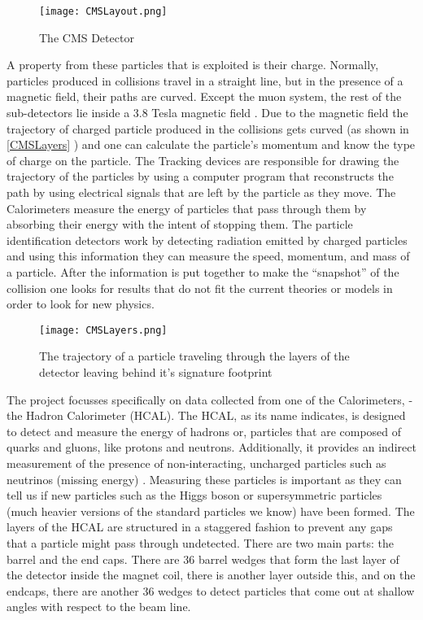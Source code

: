 \begin{figure}
\texttt{[image: CMSLayout.png]}
\caption{The CMS Detector \label{CMSLayout}}
\end{figure}

A property from these particles that is exploited is their charge. Normally, particles produced in collisions travel in a straight line, but in the presence of a magnetic field, their paths are curved. Except the muon system, the rest of the sub-detectors lie inside a 3.8 Tesla magnetic field . Due to the magnetic field the trajectory of charged particle produced in the collisions gets curved  (as shown in \autoref{CMSLayers} ) and one can calculate the particle's momentum and know the type of charge on the particle.  
The Tracking devices are responsible for drawing the trajectory of the particles by using a computer program that reconstructs the path by using electrical signals that are left by the particle as they move.  
The Calorimeters measure the energy of particles that pass through them by absorbing their energy with the intent of stopping them. The particle identification detectors work by detecting radiation emitted by charged particles and using this information they can measure the speed, momentum, and mass of a particle. After the information is put together to make the “snapshot” of the collision one looks for results that do not fit the current theories or models in order to look for new physics. \cite{CMS_detector} 


\begin{figure}
\texttt{[image: CMSLayers.png]}
\caption{The trajectory of a particle traveling through the layers of the detector leaving behind it's signature footprint\label{CMSLayers}}
\end{figure}


The project focusses specifically on data collected from one of the Calorimeters, - the Hadron Calorimeter (HCAL). The HCAL, as its name indicates, is designed to detect and measure the energy of hadrons or, particles that are composed of quarks and gluons, like protons and neutrons. Additionally, it provides an indirect measurement of the presence of non-interacting, uncharged particles such as neutrinos (missing energy) . Measuring these particles is important as they can tell us if new particles such as the Higgs boson or supersymmetric particles (much heavier versions of the standard particles we know) have been formed. The layers of the HCAL are structured in a staggered fashion to prevent any gaps that a particle might pass through undetected. There are two main parts: the barrel and the end caps. There are 36 barrel wedges that form the last layer of the detector inside the magnet coil, there is another layer outside this, and on the endcaps, there are another 36 wedges to detect particles that come out at shallow angles with respect to the beam line.


